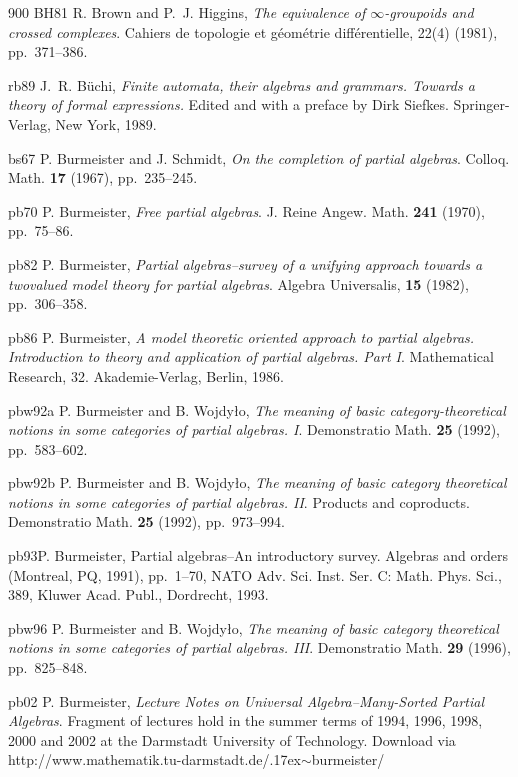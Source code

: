 \begin{thebibliography}{900}
\bibitem%
{BH81} R. Brown and P.~J. Higgins, \emph{The equivalence of $\infty $-groupoids and crossed complexes}. Cahiers de topologie et g\'{e}om\'{e}trie diff\'{e}rentielle, 22(4) (1981), pp.~371--386.

\bibitem%
{rb89} J.~R. B\"{u}chi, \emph{Finite automata, their algebras and grammars. Towards a theory of formal expressions.} Edited and with a preface by Dirk Siefkes. Springer-Verlag, New York, 1989.

\bibitem%
{bs67} P. Burmeister and J. Schmidt, \emph{On the completion of partial algebras}. Colloq. Math. \textbf{17} (1967), pp.~235--245.

\bibitem%
{pb70} P. Burmeister, \emph{Free partial algebras}. J. Reine Angew. Math. \textbf{241} (1970), pp.~75--86.

\bibitem%
{pb82} P. Burmeister, \emph{Partial algebras--survey of a unifying approach towards a twovalued
model theory for partial algebras}. Algebra Universalis, \textbf{15} (1982), pp.~306--358.

\bibitem%
{pb86} P. Burmeister, \emph{A model theoretic oriented approach to partial algebras. Introduction to theory and application of partial algebras. Part I}. Mathematical Research, 32. Akademie-Verlag, Berlin, 1986.

\bibitem%
{pbw92a} P. Burmeister and B. Wojdy{\l}o, \emph{The meaning of basic category-theoretical notions in some categories of partial algebras. I}. Demonstratio Math. \textbf{25} (1992), pp.~583--602.

\bibitem%
{pbw92b} P. Burmeister and B. Wojdy{\l}o, \emph{The meaning of basic category theoretical notions in some categories of partial algebras. II}. Products and coproducts. Demonstratio Math. \textbf{25} (1992), 
pp.~973--994.

\bibitem%
{pb93}P. Burmeister, Partial algebras--{A}n introductory survey. Algebras and orders (Montreal, PQ, 1991), pp.~1--70, NATO Adv. Sci. Inst. Ser. C: Math. Phys. Sci., 389, Kluwer Acad. Publ., Dordrecht, 1993.

\bibitem%
{pbw96} P. Burmeister and B. Wojdy{\l}o, \emph{The meaning of basic category theoretical notions in some categories of partial algebras. III}. Demonstratio Math. \textbf{29} (1996), pp.~825--848.

\bibitem%
{pb02} P. Burmeister, \emph{Lecture Notes on Universal Algebra--Many-Sorted Partial Algebras}. Fragment of lectures hold in the summer terms of 1994, 1996, 1998, 2000 and 2002 at the Darmstadt University of Technology. Download via http://www.mathematik.tu-darmstadt.de/{\raise.17ex\hbox{$\scriptstyle\mathtt{\sim}$}}burmeister/


\end{thebibliography}
